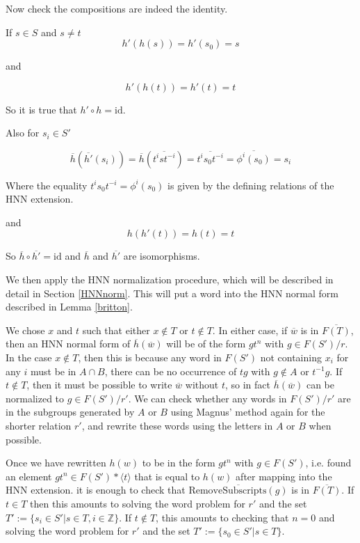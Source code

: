\documentclass[12pt]{article} %
\theoremstyle{definition}
\theoremstyle{definition}
\theoremstyle{definition}
\theoremstyle{definition}
\begin{document}
Now check the compositions are indeed the identity.

If $s \in S$ and $s \ne t$
\begin{equation}
  h'(h(s)) = h'(s_0) = s
\end{equation}

and

\begin{equation}
  h'(h(t)) = h'(t) = t
\end{equation}

So it is true that $h' \circ h = \text{id}$.

Also for $s_i \in S'$

\begin{equation}
  \overline{h}(\overline{h'}(s_i)) = \overline{h}(\overline{t^i s t^{-i}}) =
  \overline{t^i s_0 t^{-i}} = \overline{\phi^i(s_0)} = s_i
\end{equation}

Where the equality $t^i s_0 t^{-i} = \phi^i(s_0)$ is given by the defining relations
of the HNN extension.

and
\begin{equation}
  h(h'(t)) = h(t) = t
\end{equation}

So $\overline{h} \circ \overline{h'} = \text{id}$ and $\overline{h}$ and $\overline{h'}$ are isomorphisms.

We then apply the HNN normalization procedure, which will be described in detail in Section
\ref{HNNnorm}. This
will put a word into the HNN normal form described in Lemma \ref{britton}.

We chose $x$ and $t$ such that either $x \notin T$ or $t \notin T$.
In either case, if $\overline{w}$ is in $\overline{F(T)}$,
then an HNN normal form of $\overline{h}(\overline{w})$ will be of the form $g t^n$
with $g \in F(S') / r$. In the case $x \notin T$, then this is because any word in
$F(S')$ not containing $x_i$ for any $i$ must be in $A \cap B$, there can be no occurrence of
$tg$ with $g \notin A$ or $t^{-1}g.$
If $t \notin T$, then it must be possible to write $\overline{w}$ without $t$,
so in fact $\overline{h}(\overline{w})$ can be normalized
to $g \in F(S') / r'$. We can check whether any words in $F(S') / r'$ are in the subgroups
generated by $A$ or $B$ using
Magnus' method again for the shorter relation $r'$, and rewrite these words using the letters
in $A$ or $B$ when possible.

Once we have rewritten $h(w)$ to be in the form $g t^n$ with $g \in F(S')$, i.e.
found an element $gt^n \in F(S') \ast \langle t \rangle$ that is equal to $h(w)$ after
mapping into the HNN extension.
it is enough to check that
$\overline{\text{RemoveSubscripts}(g)}$ is in $\overline{F(T)}$.
If $t \in T$ then this amounts to solving the word problem for $r'$
and the set $T' := \{ s_i \in S' | s \in T, i \in \mathbb{Z} \}$.
If $t \notin T$,
this amounts to checking that $n = 0$ and solving the word problem for
$r'$ and the set $T' := \{s_0 \in S' | s \in T\}$.
\end{document}
